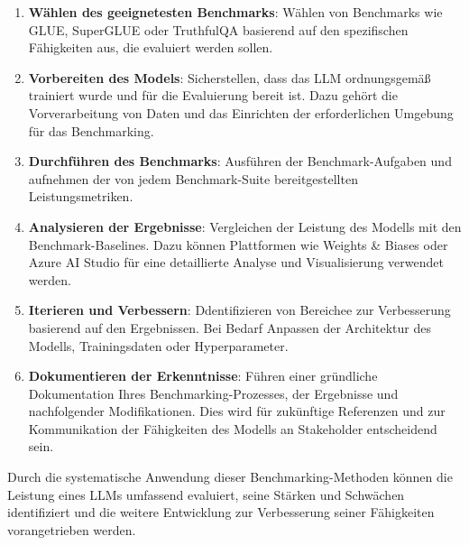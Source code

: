 \begin{enumerate} 
    \item \textbf{Wählen des geeignetesten Benchmarks}: Wählen von Benchmarks wie GLUE, SuperGLUE oder TruthfulQA basierend auf den spezifischen Fähigkeiten aus, die evaluiert werden sollen.
    \item \textbf{Vorbereiten des Models}: Sicherstellen, dass das LLM ordnungsgemäß trainiert wurde und für die Evaluierung bereit ist. Dazu gehört die Vorverarbeitung von Daten und das Einrichten der erforderlichen Umgebung für das Benchmarking.
    
    \item \textbf{Durchführen des Benchmarks}:
    Ausführen der Benchmark-Aufgaben und aufnehmen der von jedem Benchmark-Suite bereitgestellten Leistungsmetriken.
    
    \item \textbf{Analysieren der Ergebnisse}:
    Vergleichen der Leistung des Modells mit den Benchmark-Baselines. Dazu können Plattformen wie Weights \& Biases oder Azure AI Studio für eine detaillierte Analyse und Visualisierung verwendet werden.

    \item \textbf{Iterieren und Verbessern}:
    Ddentifizieren von Bereichee zur Verbesserung basierend auf den Ergebnissen. Bei Bedarf Anpassen der Architektur des Modells, Trainingsdaten oder Hyperparameter.
    
    \item \textbf{Dokumentieren der Erkenntnisse}:
    Führen einer gründliche Dokumentation Ihres Benchmarking-Prozesses, der Ergebnisse und nachfolgender Modifikationen. Dies wird für zukünftige Referenzen und zur Kommunikation der Fähigkeiten des Modells an Stakeholder entscheidend sein.

\end{enumerate}
    
Durch die systematische Anwendung dieser Benchmarking-Methoden können die Leistung eines LLMs umfassend evaluiert, seine Stärken und Schwächen identifiziert und die weitere Entwicklung zur Verbesserung seiner Fähigkeiten vorangetrieben werden.